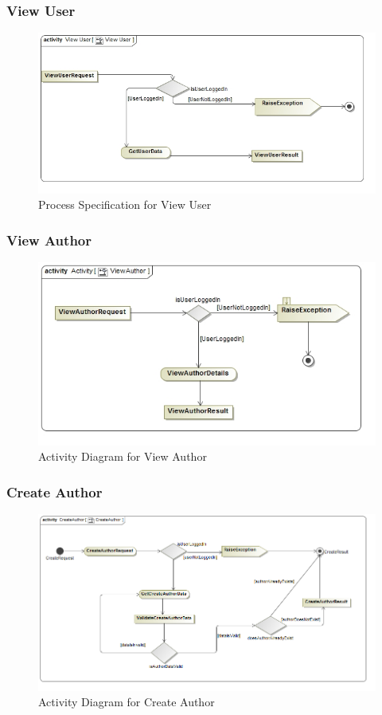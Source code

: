 \documentclass[a4paper,10pt]{article}
\begin{document}
\subsubsection{View User}
	\begin{figure}[H]
	\includegraphics[scale=0.5]{ActViewUser}
	\caption{Process Specification for View User}
	\end{figure}
	
\subsubsection{View Author}
	\begin{figure}[H]
		\includegraphics[scale=0.5]{ActViewAuthor}
		\caption{Activity Diagram for View Author}
	\end{figure}

\subsubsection{Create Author}
	\begin{figure}[H]
		\includegraphics[scale=0.5]{Activity_CreateAuthor}
		\caption{Activity Diagram for Create Author}
	\end{figure}
\end{document}
